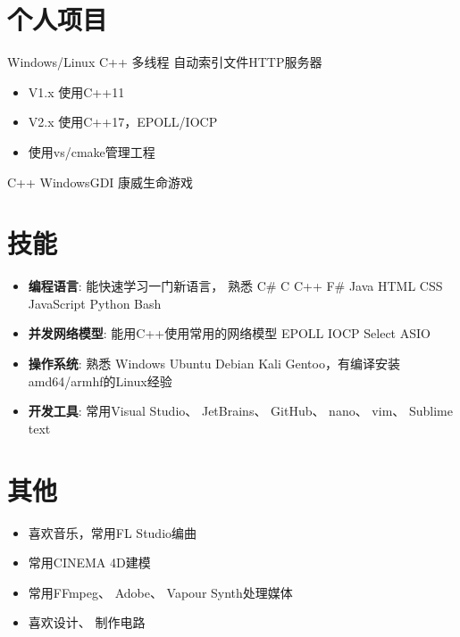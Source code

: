 \documentclass{resume}
\begin{document}
\section{个人项目}
Windows/Linux C++ 多线程 自动索引文件HTTP服务器
\begin{itemize}[parsep=0.25ex]
\item V1.x 使用C++11
\item V2.x 使用C++17，EPOLL/IOCP
\item 使用vs/cmake管理工程
\end{itemize}
C++ WindowsGDI 康威生命游戏
\section{技能}
\begin{itemize}[parsep=0.25ex]
\item
\textbf{编程语言}:
能快速学习一门新语言，
熟悉 C\# C C++ F\# Java HTML CSS JavaScript Python Bash
\item
\textbf{并发网络模型}:
能用C++使用常用的网络模型 EPOLL IOCP Select ASIO
\item
\textbf{操作系统}:
熟悉 Windows Ubuntu Debian Kali Gentoo，有编译安装amd64/armhf的Linux经验
\item
\textbf{开发工具}:
常用Visual Studio、 JetBrains、 GitHub、 nano、 vim、 Sublime text
\end{itemize}
\section{其他}
\begin{itemize}[parsep=0.25ex]
\item 喜欢音乐，常用FL Studio编曲
\item 常用CINEMA 4D建模
\item 常用FFmpeg、 Adobe、 Vapour Synth处理媒体
\item 喜欢设计、 制作电路
\end{itemize}
\end{document}
